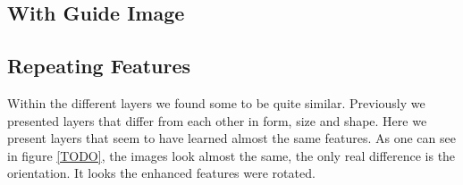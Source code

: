 \subsection{With Guide Image}
\label{sec:withguide}

\subsection{Repeating Features}
\label{sec:repeating-features}

Within the different layers we found some to be quite similar.
Previously we presented layers that differ from each other in form, size and shape. Here we present layers that seem to have learned almost the same features.
As one can see in figure \ref{TODO}, the images look almost the same, the only real difference is the orientation.
It looks the enhanced features were rotated.
